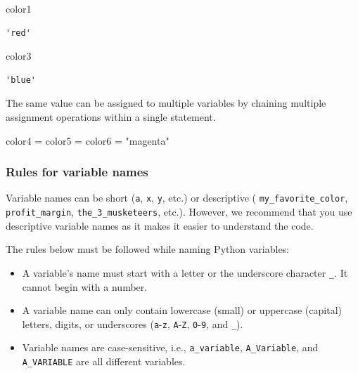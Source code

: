 \documentclass[
  letterpaper,
  DIV=11,
  numbers=noendperiod]{scrreprt}
\newenvironment{Shaded}{\begin{snugshade}}{\end{snugshade}}
\newcommand{\NormalTok}[1]{\textcolor[rgb]{0.00,0.23,0.31}{#1}}
\newcommand{\OperatorTok}[1]{\textcolor[rgb]{0.37,0.37,0.37}{#1}}
\newcommand{\StringTok}[1]{\textcolor[rgb]{0.13,0.47,0.30}{#1}}
\providecommand{\tightlist}{%
  \setlength{\itemsep}{0pt}\setlength{\parskip}{0pt}}\usepackage{longtable,booktabs,array}
\begin{document}
\begin{Shaded}
\begin{Highlighting}[]
\NormalTok{color1}
\end{Highlighting}
\end{Shaded}

\begin{verbatim}
'red'
\end{verbatim}

\begin{Shaded}
\begin{Highlighting}[]
\NormalTok{color3}
\end{Highlighting}
\end{Shaded}

\begin{verbatim}
'blue'
\end{verbatim}

The same value can be assigned to multiple variables by chaining
multiple assignment operations within a single statement.

\begin{Shaded}
\begin{Highlighting}[]
\NormalTok{color4 }\OperatorTok{=}\NormalTok{ color5 }\OperatorTok{=}\NormalTok{ color6 }\OperatorTok{=} \StringTok{"magenta"}
\end{Highlighting}
\end{Shaded}

\hypertarget{rules-for-variable-names}{%
\subsubsection{Rules for variable
names}\label{rules-for-variable-names}}

Variable names can be short (\texttt{a}, \texttt{x}, \texttt{y}, etc.)
or descriptive ( \texttt{my\_favorite\_color}, \texttt{profit\_margin},
\texttt{the\_3\_musketeers}, etc.). However, we recommend that you use
descriptive variable names as it makes it easier to understand the code.

The rules below must be followed while naming Python variables:

\begin{itemize}
\tightlist
\item
  A variable's name must start with a letter or the underscore character
  \texttt{\_}. It cannot begin with a number.
\item
  A variable name can only contain lowercase (small) or uppercase
  (capital) letters, digits, or underscores (\texttt{a}-\texttt{z},
  \texttt{A}-\texttt{Z}, \texttt{0}-\texttt{9}, and \texttt{\_}).
\item
  Variable names are case-sensitive, i.e., \texttt{a\_variable},
  \texttt{A\_Variable}, and \texttt{A\_VARIABLE} are all different
  variables.
\end{itemize}
\end{document}
